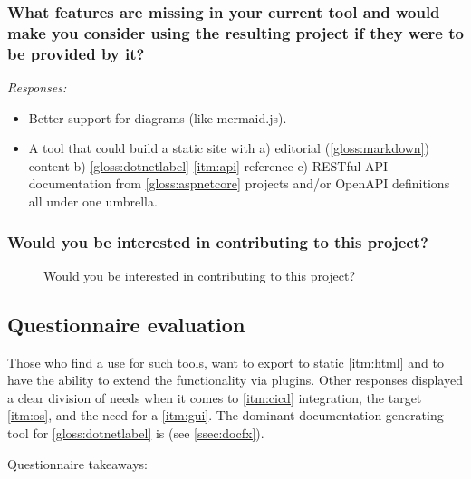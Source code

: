 \subsubsection*{What features are missing in your current tool and would make you consider using the resulting project if they were to be provided by it?}

\textit{Responses:}
\begin{itemize}
    \item Better support for diagrams (like mermaid.js).
    \item A tool that could build a static site with a) editorial (\ref{gloss:markdown}) content b) \ref{gloss:dotnetlabel} \ref{itm:api} reference c) RESTful API documentation from \ref{gloss:aspnetcore} projects and/or OpenAPI definitions all under one umbrella.
\end{itemize}

\subsubsection*{Would you be interested in contributing to this project?}

\begin{figure}[H]
    \centering
    \caption{Would you be interested in contributing to this project?}
\end{figure}

\subsection{Questionnaire evaluation} \label{ssec:questionnaireeval}

Those who find a use for such tools, want to export to static \ref{itm:html} and to have the ability to extend the functionality via plugins.
Other responses displayed a clear division of needs when it comes to \ref{itm:cicd} integration, the target \ref{itm:os}, and the need for a \ref{itm:gui}.
The dominant documentation generating tool for \ref{gloss:dotnetlabel} is  (see \ref{ssec:docfx}).

Questionnaire takeaways:

